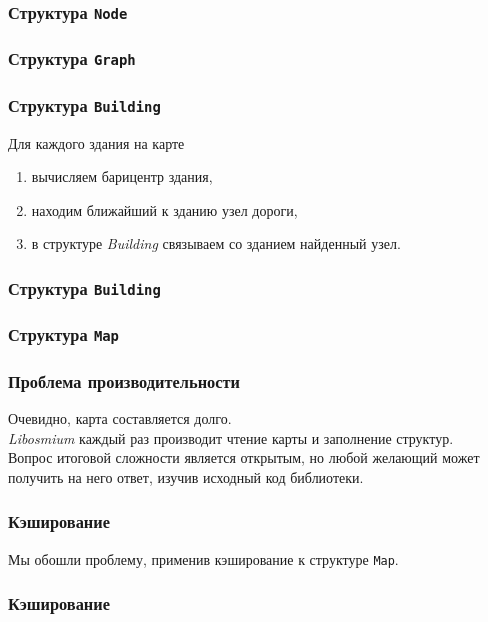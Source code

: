 \documentclass{beamer}
\begin{document}
\begin{frame}[fragile]
\frametitle{Структура \texttt{Node}}

\end{frame}

\begin{frame}[fragile]
\frametitle{Структура \texttt{Graph}}

\end{frame}

\begin{frame}
\frametitle{Структура \texttt{Building}}
Для каждого здания на карте
\begin{enumerate}
\item вычисляем барицентр здания,
\item находим ближайший к зданию узел дороги,
\item в структуре \textit{Building} связываем со зданием найденный узел.
\end{enumerate}
\end{frame}

\begin{frame}[fragile]
\frametitle{Структура \texttt{Building}}

\end{frame}

\begin{frame}[fragile]
\frametitle{Структура \texttt{Map}}

\end{frame}

\begin{frame}
\frametitle{Проблема производительности}
Очевидно, карта составляется долго.\\
\textit{Libosmium} каждый раз производит чтение карты и заполнение структур.\\
Вопрос итоговой сложности является открытым, но любой желающий может получить на него ответ, изучив исходный код библиотеки.
\end{frame}

\begin{frame}[fragile]
\frametitle{Кэширование}
Мы обошли проблему, применив кэширование к структуре \texttt{Map}.\\

\end{frame}

\begin{frame}[fragile]
\frametitle{Кэширование}

\end{frame}
\end{document}
